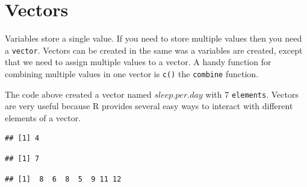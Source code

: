 \documentclass[11pt, letterpaper, twoside]{memoir}\usepackage{knitr}
\begin{document}
\section{Vectors}

Variables store a single value. If you need to store multiple values then you need a \texttt{vector}. Vectors can be created in the same was a variables are created, except that we need to assign multiple values to a vector. A handy function for combining multiple values in one vector is \texttt{c()} the \texttt{combine} function. 

\begin{knitrout}
\color{fgcolor}\begin{kframe}
\begin{alltt}
 \hlkwb{<-} \hlstd{(}\hlstd{,} \hlstd{,} \hlstd{,} \hlstd{,} \hlstd{,} \hlstd{,} \hlstd{)}
\end{alltt}
\end{kframe}
\end{knitrout}

The code above created a vector named $sleep.per.day$ with 7 \texttt{elements}. Vectors are very useful because R provides several easy ways to interact with different elements of a vector.

\begin{knitrout}
\color{fgcolor}\begin{kframe}
\begin{alltt}
\hlstd{sleep.per.day[}\hlstd{]}  
\end{alltt}
\begin{verbatim}
## [1] 4
\end{verbatim}
\begin{alltt}
\hlstd{sleep.per.day[}\hlstd{]} \hlkwb{<-}   
  
\end{alltt}
\begin{verbatim}
## [1] 7
\end{verbatim}
\begin{alltt}
 \hlopt{+}   
\end{alltt}
\begin{verbatim}
## [1]  8  6  8  5  9 11 12
\end{verbatim}
\end{kframe}
\end{knitrout}
\end{document}
